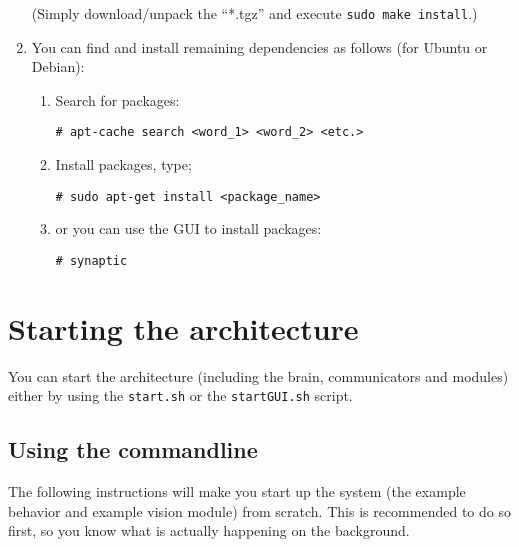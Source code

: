 \documentclass[a4paper, 10pt]{article}
\begin{document}
\begin{enumerate}
        (Simply download/unpack the ``*.tgz'' and execute \lstinline{sudo make install}.)
    \item You can find and install remaining dependencies as follows (for Ubuntu or Debian):
    \begin{enumerate}
        \item Search for packages:
\begin{lstlisting}
# apt-cache search <word_1> <word_2> <etc.>
\end{lstlisting}
        \item Install packages, type;
\begin{lstlisting}
# sudo apt-get install <package_name>
\end{lstlisting}
        \item or you can use the GUI to install packages:
\begin{lstlisting}
# synaptic
\end{lstlisting}
    \end{enumerate}
\end{enumerate}

\section{Starting the architecture}

You can start the architecture (including the brain, communicators and modules) either by using the \lstinline{start.sh} or the \lstinline{startGUI.sh} script.

\subsection{Using the commandline}

The following instructions will make you start up the system (the example behavior and example vision module) from scratch.
This is recommended to do so first, so you know what is actually happening on the background.
\end{document}
